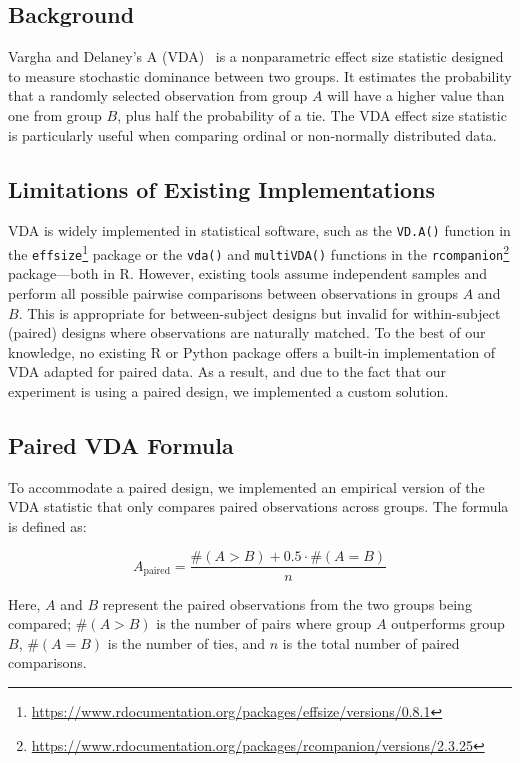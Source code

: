 \documentclass[conference]{IEEEtran}
\begin{document}
\setcounter{subsection}{0}
\subsection{Background}
Vargha and Delaney's A (VDA)~\cite{vargha2000Effect} is a nonparametric effect size statistic designed to measure stochastic dominance between two groups. It estimates the probability that a randomly selected observation from group $A$ will have a higher value than one from group $B$, plus half the probability of a tie. The VDA effect size statistic is particularly useful when comparing ordinal or non-normally distributed data.

\subsection{Limitations of Existing Implementations}
VDA is widely implemented in statistical software, such as the \verb|VD.A()| function in the \verb|effsize|\footnote{\url{https://www.rdocumentation.org/packages/effsize/versions/0.8.1}} package or the \verb|vda()| and \verb|multiVDA()| functions in the \verb|rcompanion|\footnote{\url{https://www.rdocumentation.org/packages/rcompanion/versions/2.3.25}} package---both in R. However, existing tools assume independent samples and perform all possible pairwise comparisons between observations in groups $A$ and $B$. This is appropriate for between-subject designs but invalid for within-subject (paired) designs where observations are naturally matched. To the best of our knowledge, no existing R or Python package offers a built-in implementation of VDA adapted for paired data. As a result, and due to the fact that our experiment is using a paired design, we implemented a custom solution.

\subsection{Paired VDA Formula}
To accommodate a paired design, we implemented an empirical version of the VDA statistic that only compares paired observations across groups. The formula is defined as:

\begin{equation}
A_{\text{paired}} = \frac{\#(A > B) + 0.5 \cdot \#(A = B)}{n}
\end{equation}

Here, $A$ and $B$ represent the paired observations from the two groups being compared; $\#(A > B)$ is the number of pairs where group $A$ outperforms group $B$, $\#(A = B)$ is the number of ties, and $n$ is the total number of paired comparisons.
\end{document}
